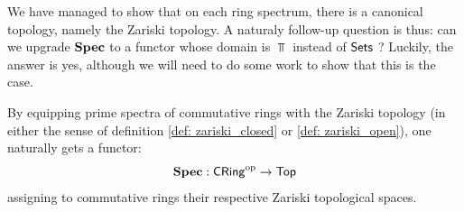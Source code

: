                 We have managed to show that on each ring spectrum, there is a canonical topology, namely the Zariski topology. A naturaly follow-up question is thus: can we upgrade $\mathbf{Spec}$ to a functor whose domain is $\Top$ instead of $\mathsf{Sets}$ ? Luckily, the answer is yes, although we will need to do some work to show that this is the case. 
                \begin{proposition} \label{prop: continuous_functions_between_spectra}
                    By equipping prime spectra of commutative rings with the Zariski topology (in either the sense of definition \ref{def: zariski_closed} or \ref{def: zariski_open}), one naturally gets a functor:
                        $$\mathbf{Spec}: \mathsf{CRing}^{\mathrm{op}} \to \mathsf{Top}$$
                    assigning to commutative rings their respective Zariski topological spaces.
                \end{proposition}
